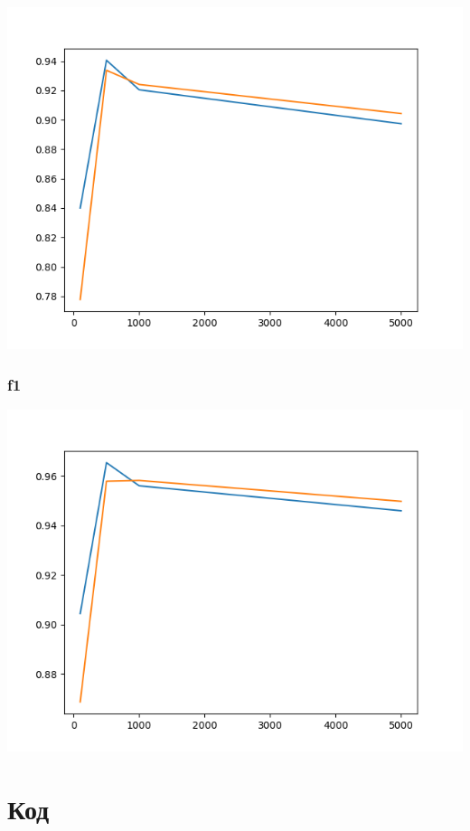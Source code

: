 \documentclass[11pt]{article}
\begin{document}
\begin{center}
\includegraphics[scale=0.7]{./res/b_recall.png}
\end{center}

\subsubsection*{f1}
\label{sec:org52f3da3}

\begin{center}
\includegraphics[scale=0.7]{./res/b_f1.png}
\end{center}

\section*{Код}
\label{sec:org18f4c88}
\end{document}
